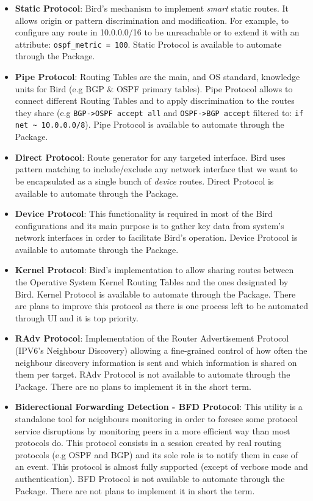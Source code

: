 \begin{itemize}
    \item \textbf{Static Protocol}: Bird's mechanism to implement \textit{smart} static routes. It allows  origin or pattern discrimination and modification. For example, to configure any route in 10.0.0.0/16 to be unreachable or to extend it with an attribute: \texttt{ospf\_metric = 100}.
    Static Protocol is available to automate through the Package.
    \item \textbf{Pipe Protocol}: Routing Tables are the main, and OS standard, knowledge units for Bird (e.g BGP \& OSPF primary tables). Pipe Protocol allows to connect different Routing Tables and to apply discrimination to the routes they share (e.g \texttt{BGP->OSPF accept all} and \texttt{OSPF->BGP accept} filtered to: \texttt{if net \~{} 10.0.0.0/8}).
    Pipe Protocol is available to automate through the Package.
    \item \textbf{Direct Protocol}: Route generator for any targeted interface. Bird uses pattern matching to include/exclude any network interface that we want to be encapsulated as a single bunch of \textit{device} routes.
    Direct Protocol is available to automate through the Package.
    \item \textbf{Device Protocol}: This functionality is required in most of the Bird configurations and its main purpose is to gather key data from system's network interfaces in order to facilitate Bird's operation.
    Device Protocol is available to automate through the Package.
    \item \textbf{Kernel Protocol}: Bird's implementation to allow sharing routes between the Operative System Kernel Routing Tables and the ones designated by Bird.
    Kernel Protocol is available to automate through the Package. There are plans to improve this protocol as there is one process left to be automated through UI and it is top priority.
    \item \textbf{RAdv Protocol}: Implementation of the Router Advertisement Protocol (IPV6's Neighbour Discovery) allowing a fine-grained control of how often the neighbour discovery information is sent and which information is shared on them per target.
    RAdv Protocol is not available to automate through the Package. There are no plans to implement it in the short term. 
    \item \textbf{Biderectional Forwarding Detection - BFD Protocol}: This utility is a standalone tool for neighbours monitoring in order to foresee some protocol service disruptions by monitoring peers in a more efficient way than most protocols do. This protocol consists in a session created by real routing protocols (e.g OSPF and BGP) and its sole role is to notify them in case of an event. This protocol is almost fully supported (except of verbose mode and authentication).
    BFD Protocol is not available to automate through the Package. There are not plans to implement it in short the term.
\end{itemize}


